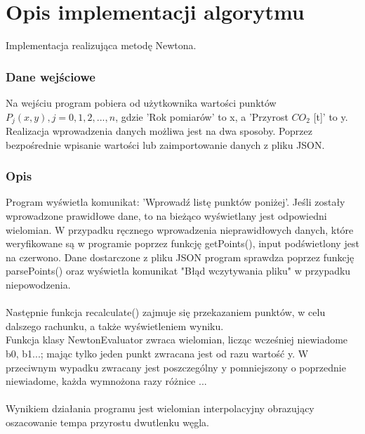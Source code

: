 \documentclass[12pt]{article}
\begin{document}
\section{Opis implementacji algorytmu}
Implementacja realizująca metodę Newtona.
\subsubsection{Dane wejściowe}
Na wejściu program pobiera od użytkownika wartości punktów \\$P_{j}(x,y), j=0,1,2,...,n$, gdzie 'Rok pomiarów' to x, a 'Przyrost $ CO_{2}$ [t]' to y. Realizacja wprowadzenia danych możliwa jest na dwa sposoby. Poprzez bezpośrednie wpisanie wartości lub zaimportowanie danych z pliku JSON.
\subsubsection{Opis}
Program wyświetla komunikat: 'Wprowadź listę punktów poniżej'. Jeśli zostały wprowadzone prawidłowe dane, to na bieżąco wyświetlany jest odpowiedni wielomian. 
W przypadku ręcznego wprowadzenia nieprawidłowych danych, które weryfikowane są w programie poprzez funkcję getPoints(), input podświetlony jest na czerwono.
Dane dostarczone z pliku JSON program sprawdza poprzez funkcję parsePoints() oraz wyświetla komunikat "Błąd wczytywania pliku" w przypadku niepowodzenia.\\\\
Następnie funkcja recalculate() zajmuje się przekazaniem punktów, w celu dalszego rachunku, a także wyświetleniem wyniku.\\
Funkcja klasy NewtonEvaluator zwraca wielomian, licząc wcześniej niewiadome b0, b1...; mając tylko jeden punkt zwracana jest od razu wartość y. W przeciwnym wypadku zwracany jest poszczególny y pomniejszony o poprzednie niewiadome, każda wymnożona razy różnice ...
\\ \\
Wynikiem działania programu jest wielomian interpolacyjny obrazujący oszacowanie tempa przyrostu dwutlenku węgla.
\end{document}
